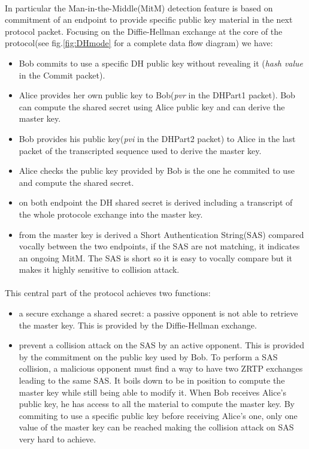 \documentclass[a4paper,11pt]{article}
\begin{document}
\paragraph*{}In particular the Man-in-the-Middle(MitM) detection feature is based on commitment of an endpoint to provide specific public key material in the next protocol packet. Focusing on the Diffie-Hellman exchange at the core of the protocol(see fig.\ref{fig:DHmode} for a complete data flow diagram) we have:
\begin{itemize}
  \item Bob commits to use a specific DH public key without revealing it (\textit{hash value} in the Commit packet).
  \item Alice provides her own public key to Bob(\textit{pvr} in the DHPart1 packet). Bob can compute the shared secret using Alice public key and can derive the master key.
  \item Bob provides his public key(\textit{pvi} in the DHPart2 packet) to Alice in the last packet of the transcripted sequence used to derive the master key.
  \item Alice checks the public key provided by Bob is the one he commited to use and compute the shared secret.
  \item on both endpoint the DH shared secret is derived including a transcript of the whole protocole exchange into the master key.
  \item from the master key is derived a Short Authentication String(SAS) compared vocally between the two endpoints, if the SAS are not matching, it indicates an ongoing MitM. The SAS is short so it is easy to vocally compare but it makes it highly sensitive to collision attack.
\end{itemize}
\paragraph*{}This central part of the protocol achieves two functions:
\begin{itemize}
  \item a secure exchange a shared secret: a passive opponent is not able to retrieve the master key. This is provided by the Diffie-Hellman exchange.
  \item prevent a collision attack on the SAS by an active opponent. This is provided by the commitment on the public key used by Bob. To perform a SAS collision, a malicious opponent must find a way to have two ZRTP exchanges leading to the same SAS. It boils down to be in position to compute the master key while still being able to modify it. When Bob receives Alice's public key, he has access to all the material to compute the master key. By commiting to use a specific public key before receiving Alice's one, only one value of the master key can be reached making the collision attack on SAS very hard to achieve.
\end{itemize}
\end{document}
